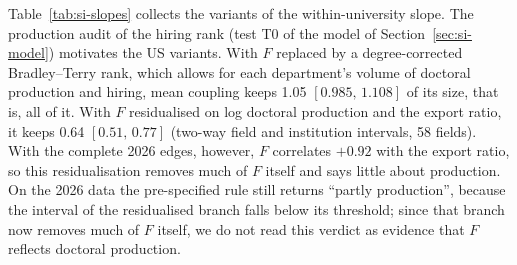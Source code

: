 \documentclass[11pt]{article}
\newcommand{\ci}[2]{$[#1,\allowbreak\,#2]$}
\begin{document}
Table~\ref{tab:si-slopes} collects the variants of the within-university slope. The production audit of the hiring
rank (test T0 of the model of Section~\ref{sec:si-model}) motivates the US variants. With $F$ replaced by a
degree-corrected Bradley--Terry rank, which allows for
each department's volume of doctoral production and hiring, mean coupling keeps 1.05 \ci{0.985}{1.108} of its size,
that is, all of it. With $F$ residualised on log doctoral production and the export ratio, it keeps 0.64
\ci{0.51}{0.77} (two-way field and institution intervals, 58 fields). With the complete 2026 edges, however, $F$
correlates $+0.92$ with the export ratio, so this residualisation removes much of $F$ itself and says little about
production. On the 2026 data the pre-specified rule still returns ``partly production'', because the interval of the
residualised branch falls below its threshold; since that branch now removes much of $F$ itself, we do not read this
verdict as evidence that $F$ reflects doctoral production.
\end{document}
